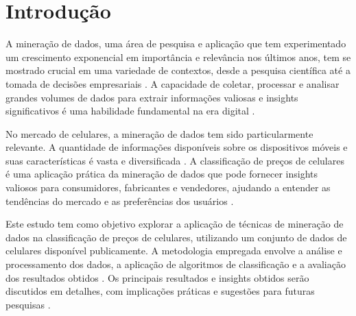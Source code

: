 \documentclass[conference]{IEEEtran}
\begin{document}









\section{Introdução}

A mineração de dados, uma área de pesquisa e aplicação que tem experimentado um crescimento exponencial em importância e relevância nos últimos anos, tem se mostrado crucial em uma variedade de contextos, desde a pesquisa científica até a tomada de decisões empresariais \cite{WikipediaDataMining}. A capacidade de coletar, processar e analisar grandes volumes de dados para extrair informações valiosas e insights significativos é uma habilidade fundamental na era digital \cite{Zaki2023}.

No mercado de celulares, a mineração de dados tem sido particularmente relevante. A quantidade de informações disponíveis sobre os dispositivos móveis e suas características é vasta e diversificada \cite{Statista2023}. A classificação de preços de celulares é uma aplicação prática da mineração de dados que pode fornecer insights valiosos para consumidores, fabricantes e vendedores, ajudando a entender as tendências do mercado e as preferências dos usuários \cite{Russell2016}.

Este estudo tem como objetivo explorar a aplicação de técnicas de mineração de dados na classificação de preços de celulares, utilizando um conjunto de dados de celulares disponível publicamente. A metodologia empregada envolve a análise e processamento dos dados, a aplicação de algoritmos de classificação e a avaliação dos resultados obtidos \cite{ScikitLearn2023}. Os principais resultados e insights obtidos serão discutidos em detalhes, com implicações práticas e sugestões para futuras pesquisas \cite{Jurafsky2020}.
\end{document}
